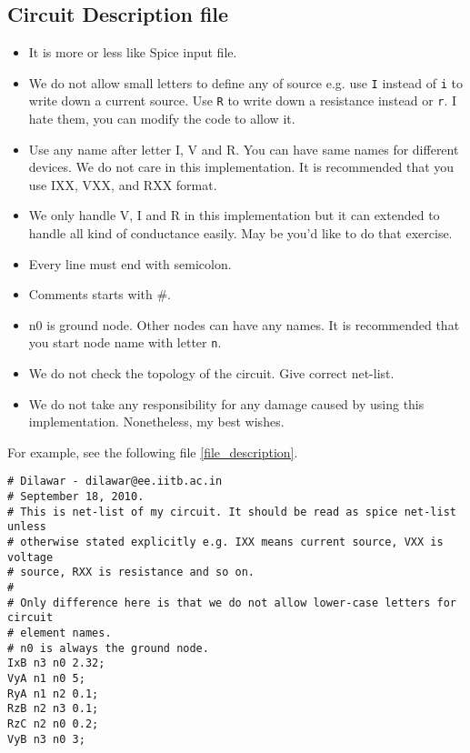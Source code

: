 \documentclass[a4paper,10pt]{article}
\begin{document}
\subsection{Circuit Description file}
\label{subsec:circuit_description_file}
\begin{itemize}
   \item It is more or less like \textsf{Spice} input file.
   \item We do not allow small letters to define any of source e.g. use
\texttt{I} instead of \texttt{i} to write down a current source. Use \texttt{R}
to write down a resistance instead or \texttt{r}. I hate them, you can modify
the code to allow it.

\item Use any name after letter I, V and R. You can have same names for
different devices. We do not care in this implementation. It is recommended
that you use IXX, VXX, and RXX format.
\item We only handle V, I and R in this implementation but it can extended to
handle all kind of conductance easily. May be you'd like to do that exercise.
\item Every line must end with semicolon.
\item Comments starts with \#.
\item n0 is ground node. Other nodes can have any names. It is recommended that
you start node name with letter \texttt{n}.
\item We do not check the topology of the circuit. Give correct net-list.
\item We do not take any responsibility for any damage caused by using this
implementation. Nonetheless, my best wishes.
\end{itemize}
\par
For example, see the following file \ref{file_description}.
\small
\begin{verbatim}
# Dilawar - dilawar@ee.iitb.ac.in
# September 18, 2010.
# This is net-list of my circuit. It should be read as spice net-list unless
# otherwise stated explicitly e.g. IXX means current source, VXX is voltage
# source, RXX is resistance and so on.
#
# Only difference here is that we do not allow lower-case letters for circuit
# element names.
# n0 is always the ground node.
IxB n3 n0 2.32;
VyA n1 n0 5;
RyA n1 n2 0.1;
RzB n2 n3 0.1;
RzC n2 n0 0.2;
VyB n3 n0 3;
\end{verbatim}
\label{file_description}
\end{document}
